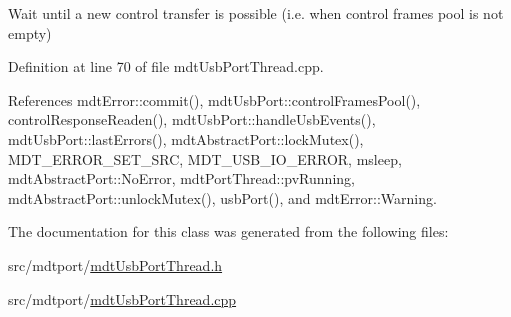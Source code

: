 Wait until a new control transfer is possible (i.\-e. when control frames pool is not empty) 



Definition at line 70 of file mdt\-Usb\-Port\-Thread.\-cpp.



References mdt\-Error\-::commit(), mdt\-Usb\-Port\-::control\-Frames\-Pool(), control\-Response\-Readen(), mdt\-Usb\-Port\-::handle\-Usb\-Events(), mdt\-Usb\-Port\-::last\-Errors(), mdt\-Abstract\-Port\-::lock\-Mutex(), M\-D\-T\-\_\-\-E\-R\-R\-O\-R\-\_\-\-S\-E\-T\-\_\-\-S\-R\-C, M\-D\-T\-\_\-\-U\-S\-B\-\_\-\-I\-O\-\_\-\-E\-R\-R\-O\-R, msleep, mdt\-Abstract\-Port\-::\-No\-Error, mdt\-Port\-Thread\-::pv\-Running, mdt\-Abstract\-Port\-::unlock\-Mutex(), usb\-Port(), and mdt\-Error\-::\-Warning.



The documentation for this class was generated from the following files\-:\begin{DoxyCompactItemize}
\item 
src/mdtport/\hyperlink{mdt_usb_port_thread_8h}{mdt\-Usb\-Port\-Thread.\-h}\item 
src/mdtport/\hyperlink{mdt_usb_port_thread_8cpp}{mdt\-Usb\-Port\-Thread.\-cpp}\end{DoxyCompactItemize}
